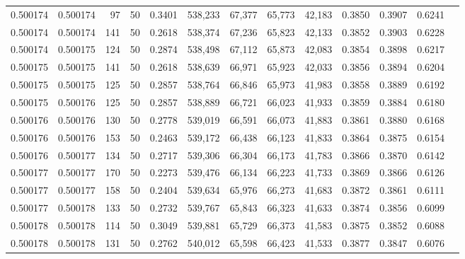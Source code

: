 \begin{tabular}{rrrrrrrrrrrrr}
0.500174 & 0.500174 &    97 &  50 &                                     0.3401 & 538,233 &  67,377 &  65,773 &  42,183 & 0.3850 & 0.3907 & 0.6241 \\
0.500174 & 0.500174 &   141 &  50 &                                     0.2618 & 538,374 &  67,236 &  65,823 &  42,133 & 0.3852 & 0.3903 & 0.6228 \\
0.500174 & 0.500175 &   124 &  50 &                                     0.2874 & 538,498 &  67,112 &  65,873 &  42,083 & 0.3854 & 0.3898 & 0.6217 \\
0.500175 & 0.500175 &   141 &  50 &                                     0.2618 & 538,639 &  66,971 &  65,923 &  42,033 & 0.3856 & 0.3894 & 0.6204 \\
0.500175 & 0.500175 &   125 &  50 &                                     0.2857 & 538,764 &  66,846 &  65,973 &  41,983 & 0.3858 & 0.3889 & 0.6192 \\
0.500175 & 0.500176 &   125 &  50 &                                     0.2857 & 538,889 &  66,721 &  66,023 &  41,933 & 0.3859 & 0.3884 & 0.6180 \\
0.500176 & 0.500176 &   130 &  50 &                                     0.2778 & 539,019 &  66,591 &  66,073 &  41,883 & 0.3861 & 0.3880 & 0.6168 \\
0.500176 & 0.500176 &   153 &  50 &                                     0.2463 & 539,172 &  66,438 &  66,123 &  41,833 & 0.3864 & 0.3875 & 0.6154 \\
0.500176 & 0.500177 &   134 &  50 &                                     0.2717 & 539,306 &  66,304 &  66,173 &  41,783 & 0.3866 & 0.3870 & 0.6142 \\
0.500177 & 0.500177 &   170 &  50 &                                     0.2273 & 539,476 &  66,134 &  66,223 &  41,733 & 0.3869 & 0.3866 & 0.6126 \\
0.500177 & 0.500177 &   158 &  50 &                                     0.2404 & 539,634 &  65,976 &  66,273 &  41,683 & 0.3872 & 0.3861 & 0.6111 \\
0.500177 & 0.500178 &   133 &  50 &                                     0.2732 & 539,767 &  65,843 &  66,323 &  41,633 & 0.3874 & 0.3856 & 0.6099 \\
0.500178 & 0.500178 &   114 &  50 &                                     0.3049 & 539,881 &  65,729 &  66,373 &  41,583 & 0.3875 & 0.3852 & 0.6088 \\
0.500178 & 0.500178 &   131 &  50 &                                     0.2762 & 540,012 &  65,598 &  66,423 &  41,533 & 0.3877 & 0.3847 & 0.6076 \\

\end{tabular}
